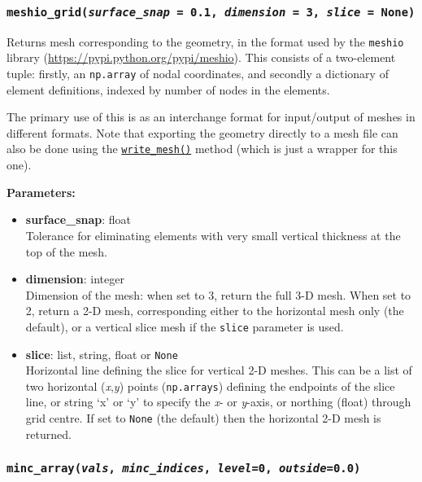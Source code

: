 \begin{snugshade}\subsubsection{\texttt{meshio\_grid(\emph{surface\_snap} = 0.1, \emph{dimension} = 3, \emph{slice} = \texttt{None})}}\end{snugshade}
\label{sec:mulgrid:meshio_grid}

Returns mesh corresponding to the geometry, in the format used by the \texttt{meshio} library (\url{https://pypi.python.org/pypi/meshio}). This consists of a two-element tuple: firstly, an \texttt{np.array} of nodal coordinates, and secondly a dictionary of element definitions, indexed by number of nodes in the elements.

The primary use of this is as an interchange format for input/output of meshes in different formats. Note that exporting the geometry directly to a mesh file can also be done using the \hyperref[sec:mulgrid:write_mesh]{\texttt{write\_mesh()}} method (which is just a wrapper for this one).

\textbf{Parameters:}
\begin{itemize}
\item \textbf{surface\_snap}: float\\
  Tolerance for eliminating elements with very small vertical thickness at the top of the mesh.
\item \textbf{dimension}: integer\\
  Dimension of the mesh: when set to 3, return the full 3-D mesh. When set to 2, return a 2-D mesh, corresponding either to the horizontal mesh only (the default), or a vertical slice mesh if the \texttt{slice} parameter is used.
\item \textbf{slice}: list, string, float or \texttt{None}\\
  Horizontal line defining the slice for vertical 2-D meshes. This can be a list of two horizontal (\emph{x},\emph{y}) points (\texttt{np.arrays}) defining the endpoints of the slice line, or string `x' or `y' to specify the \emph{x}- or \emph{y}-axis, or northing (float) through grid centre. If set to \texttt{None} (the default) then the horizontal 2-D mesh is returned.
\end{itemize}

\begin{snugshade}\subsubsection{\texttt{minc\_array(\emph{vals}, \emph{minc\_indices}, \emph{level}=0, \emph{outside}=0.0)}}\end{snugshade}
\label{sec:mulgrid:minc_array}

